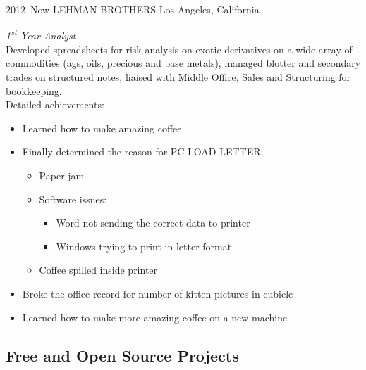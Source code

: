 \documentclass[]{friggeri-cv} %
\begin{document}
\begin{entrylist}
\entry
{2012--Now}
{LEHMAN BROTHERS}
{Los Angeles, California}
{\emph{1\textsuperscript{st} Year Analyst} \\
Developed spreadsheets for risk analysis on exotic derivatives on a wide array of commodities (ags, oils, precious and base metals), managed blotter and secondary trades on structured notes, liaised with Middle Office, Sales and Structuring for bookkeeping. \\
Detailed achievements:
\begin{itemize}
\item Learned how to make amazing coffee
\item Finally determined the reason for \textsc{PC LOAD LETTER}:
\begin{itemize}
\item Paper jam
\item Software issues:
\begin{itemize}
\item Word not sending the correct data to printer
\item Windows trying to print in letter format
\end{itemize}
\item Coffee spilled inside printer
\end{itemize}
\item Broke the office record for number of kitten pictures in cubicle
\item Learned how to make more amazing coffee on a new machine
\end{itemize}}


\end{entrylist}

\subsection{Free and Open Source Projects}
\end{document}
